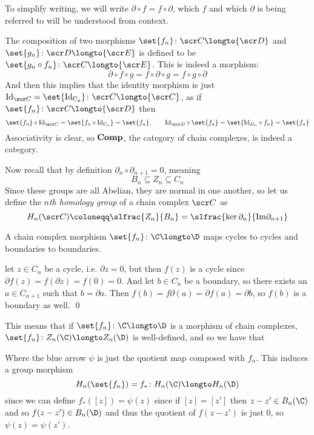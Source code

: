 To simplify writing, we will write $\partial\circ f=f\circ\partial$, which $f$ and which $\partial$ is being referred to will be understood from context.

The composition of two morphisms $\set{f_n}\colon{\scr C}\longto{\scr D}$ and $\set{g_n}\colon{\scr D}\longto{\scr E}$ is defined to be $\set{g_n\circ f_n}\colon{\scr C}\longto{\scr E}$.
This is indeed a morphism:
$$ \partial\circ f\circ g = f\circ\partial\circ g = f\circ g\circ\partial $$
And then this implies that the identity morphism is just ${\rm Id}_{\scr C}=\set{\rm Id_{C_n}}\colon{\scr C}\longto{\scr C}$, as if $\set{f_n}\colon{\scr C}\longto{\scr D}$ then
$$ \set{f_n}\circ{\rm Id}_{\scr C} = \set{f_n\circ {\rm Id}_{C_n}} = \set{f_n},\qquad {\rm Id}_{\scr D}\circ\set{f_n} = \set{{\rm Id}_{D_n}\circ f_n} = \set{f_n} $$
Associativity is clear, so ${\bf Comp}$, the category of chain complexes, is indeed a category.

Now recall that by definition $\partial_n\circ\partial_{n+1}=0$, meaning
$$ B_n \subseteq Z_n \subseteq C_n $$
Since these groups are all Abelian, they are normal in one another, so let us define the {\it $n$th homology group} of a chain complex $\scr C$ as
$$ H_n({\scr C})\coloneqq\slfrac{\displaystyle Z_n}{\displaystyle B_n} = \slfrac{\displaystyle\ker\partial_n}{\displaystyle{\rm Im}\partial_{n+1}} $$

\bprop

    A chain complex morphism $\set{f_n}\colon\C\longto\D$ maps cycles to cycles and boundaries to boundaries.

\eprop

\Proof let $z\in C_n$ be a cycle, i.e. $\partial z=0$, but then $f(z)$ is a cycle since $\partial f(z)=f(\partial z)=f(0)=0$.
And let $b\in C_n$ be a boundary, so there exists an $a\in C_{n+1}$ such that $b=\partial a$.
Then $f(b)=f\partial(a)=\partial f(a)=\partial b$, so $f(b)$ is a boundary as well.
\qed

This means that if $\set{f_n}\colon\C\longto\D$ is a morphism of chain complexes, $\set{f_n}\colon Z_n(\C)\longto Z_n(\D)$ is well-defined, and so we have that

\centerline{\def\diagrowbuf{.5cm}\def\diagcolbuf{.5cm}
}

Where the blue arrow $\psi$ is just the quotient map composed with $f_n$.
This induces a group morphism
$$ H_n(\set{f_n}) = f_*\colon H_n(\C)\longto H_n(\D) $$
since we can define $f_*([z])=\psi(z)$ since if $[z]=[z']$ then $z-z'\in B_n(\C)$ and so $f(z-z')\in B_n(\D)$ and thus the quotient of $f(z-z')$ is just $0$, so $\psi(z)=\psi(z')$.

